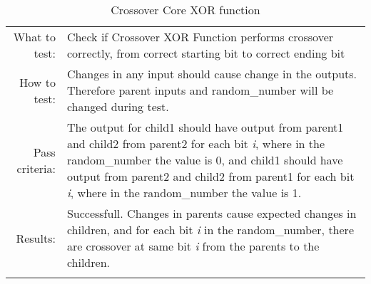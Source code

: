 \begin{table}[H]
  \begin{tabular}{r | p{9cm}}
    \noalign{\smallskip}\hline\noalign{\smallskip}
    
    What to test:  & Check if Crossover XOR Function performs crossover
                     correctly, from correct starting bit to correct ending bit \\

    \noalign{\smallskip}\hline\noalign{\smallskip}

    How to test:   &    Changes in any input should cause change in the outputs.
                        Therefore parent inputs and random\_number will be changed
                        during test.  
                        \\
                      
    \noalign{\smallskip}\hline\noalign{\smallskip}

    Pass criteria: &    The output for child1 should have output from parent1 and child2
                        from parent2 for each bit \emph{i}, where in the random\_number 
                        the value is 0, and child1 should have output from parent2 and 
                        child2 from parent1 for each bit \emph{i}, where in the 
                        random\_number the value is 1.
                        \\
    \noalign{\smallskip}\hline\noalign{\smallskip}
    
    Results: &      Successfull.
                    Changes in parents cause expected changes in children, and for each
                    bit \emph{i} in the random\_number, there are crossover at same bit    
                    \emph{i} from the parents to the children.
                    \\
   \noalign{\smallskip}\hline\noalign{\smallskip}
  
  
  
  \end{tabular}
  \caption{Crossover Core XOR function}
  \label{testing:components:genetic_pipeline:crossover_core_xor}
\end{table}
